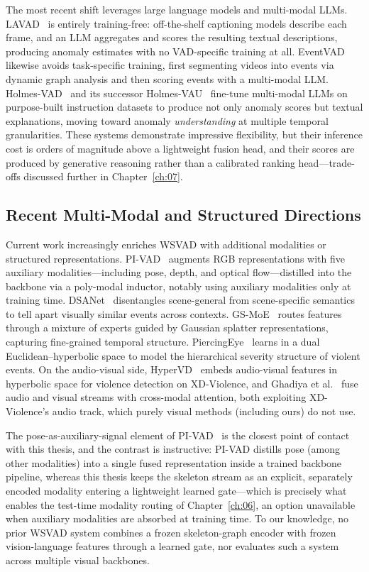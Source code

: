 The most recent shift leverages large language models and multi-modal LLMs.
LAVAD~\cite{zanella2024lavad} is entirely training-free: off-the-shelf captioning models describe
each frame, and an LLM aggregates and scores the resulting textual descriptions, producing
anomaly estimates with no VAD-specific training at all. EventVAD~\cite{shao2025eventvad} likewise
avoids task-specific training, first segmenting videos into events via dynamic graph analysis and
then scoring events with a multi-modal LLM. Holmes-VAD~\cite{zhang2024holmesvad} and its
successor Holmes-VAU~\cite{zhang2025holmesvau} fine-tune multi-modal LLMs on purpose-built
instruction datasets to produce not only anomaly scores but textual explanations, moving toward
anomaly \emph{understanding} at multiple temporal granularities. These systems demonstrate
impressive flexibility, but their inference cost is orders of magnitude above a lightweight
fusion head, and their scores are produced by generative reasoning rather than a calibrated
ranking head---trade-offs discussed further in Chapter~\ref{ch:07}.

\subsection{Recent Multi-Modal and Structured Directions}

Current work increasingly enriches WSVAD with additional modalities or structured representations.
PI-VAD~\cite{majhi2025pivad} augments RGB representations with five auxiliary modalities---including
pose, depth, and optical flow---distilled into the backbone via a poly-modal inductor, notably
using auxiliary modalities only at training time. DSANet~\cite{yin2026dsanet} disentangles
scene-general from scene-specific semantics to tell apart visually similar events across contexts.
GS-MoE~\cite{damicantonio2025gsmoe} routes features through a mixture of experts guided by Gaussian
splatter representations, capturing fine-grained temporal structure. PiercingEye~\cite{leng2026piercingeye}
learns in a dual Euclidean--hyperbolic space to model the hierarchical severity structure of
violent events. On the audio-visual side, HyperVD~\cite{peng2024hypervd} embeds audio-visual
features in hyperbolic space for violence detection on XD-Violence, and Ghadiya et
al.~\cite{ghadiya2024crossmodal} fuse audio and visual streams with cross-modal attention,
both exploiting XD-Violence's audio track, which purely visual methods (including ours) do not use.

The pose-as-auxiliary-signal element of PI-VAD~\cite{majhi2025pivad} is the closest point of
contact with this thesis, and the contrast is instructive: PI-VAD distills pose (among other
modalities) into a single fused representation inside a trained backbone pipeline, whereas this
thesis keeps the skeleton stream as an explicit, separately encoded modality entering a
lightweight learned gate---which is precisely what enables the test-time modality routing of
Chapter~\ref{ch:06}, an option unavailable when auxiliary modalities are absorbed at training
time. To our knowledge, no prior WSVAD system combines a frozen skeleton-graph encoder with
frozen vision-language features through a learned gate, nor evaluates such a system across
multiple visual backbones.

